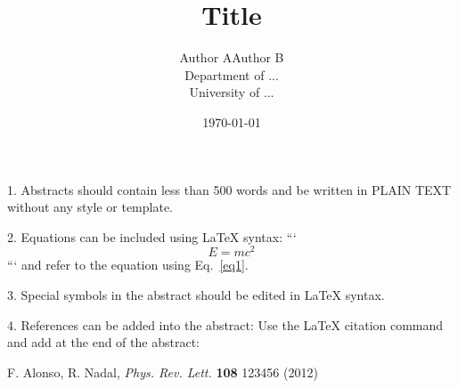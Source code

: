 \documentclass[12pt]{article}
\title{Title}
\author{Author A\qquad Author B\\
Department of ...\\
University of ...}
\date{\today}
\begin{document}
\maketitle

1. Abstracts should contain less than 500 words and be written in
    PLAIN TEXT without any style or template.

2. Equations can be included using LaTeX syntax:
```
\begin{equation}\label{eq1}
E=mc^2
\end{equation}
```
and refer to the equation using Eq.~\ref{eq1}.

3. Special symbols in the abstract should be edited in LaTeX syntax.

4. References can be added into the abstract:
   Use the LaTeX citation command \cite{key} and add at
   the end of the abstract:


\begin{thebibliography}{10}
F. Alonso, R. Nadal, {\it Phys. Rev. Lett.} {\bf 108} 123456 (2012)
\end{thebibliography}
\end{document}
